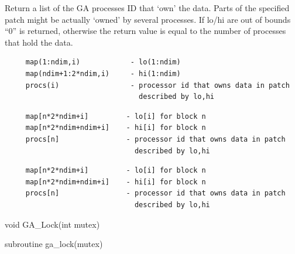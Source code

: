 \documentclass[12pt]{article}
\begin{document}
\local

\begin{desc}

Return a list of the GA processes ID that `own' the data. Parts of the
specified patch might be actually `owned' by several processes. If lo/hi are
out of bounds ``0'' is returned, otherwise the return value is equal to the
number of processes that hold the data.

\begin{fdesc}
\begin{verbatim}
     map(1:ndim,i)            - lo(1:ndim)
     map(ndim+1:2*ndim,i)     - hi(1:ndim)
     procs(i)                 - processor id that owns data in patch
                                described by lo,hi
\end{verbatim}
\end{fdesc}

\begin{cdesc}
\begin{verbatim}
     map[n*2*ndim+i]         - lo[i] for block n
     map[n*2*ndim+ndim+i]    - hi[i] for block n
     procs[n]                - processor id that owns data in patch
                               described by lo,hi
\end{verbatim}
\end{cdesc}

\begin{cxxdesc}
\begin{verbatim}
     map[n*2*ndim+i]         - lo[i] for block n
     map[n*2*ndim+ndim+i]    - hi[i] for block n
     procs[n]                - processor id that owns data in patch
                               described by lo,hi
\end{verbatim}
\end{cxxdesc}

\end{desc}



\begin{capi}
\begin{ccode}
void GA_Lock(int mutex)
\end{ccode}
\begin{funcargs}
\end{funcargs}
\end{capi}

\begin{fapi}
\begin{fcode}
subroutine ga_lock(mutex)
\end{fcode}
\begin{funcargs}
\end{funcargs}
\end{fapi}
\end{document}
